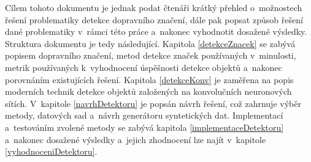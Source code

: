 Cílem tohoto dokumentu je jednak podat čtenáři krátký přehled o~možnostech řešení problematiky detekce dopravního značení, dále pak popsat způsob řešení dané problematiky v~rámci této práce a~nakonec vyhodnotit dosažené výsledky.
Struktura dokumentu je tedy následující.
Kapitola \ref{detekceZnacek} se zabývá popisem dopravního značení, metod detekce značek používaných v~minulosti, metrik používaných k~vyhodnocení úspěšnosti detekce objektů a~nakonec porovnáním existujících řešení.
Kapitola \ref{detekceKonv} je zaměřena na popis moderních technik detekce objektů založených na konvolučních neuronových sítích.
V~kapitole \ref{navrhDetektoru} je popsán návrh řešení, což zahrnuje výběr metody, datových sad a~návrh generátoru syntetických dat.
Implementací a~testováním zvolené metody se zabývá kapitola \ref{implementaceDetektoru} a~nakonec dosažené výsledky a~jejich zhodnocení lze najít v~kapitole \ref{vyhodnoceniDetektoru}.